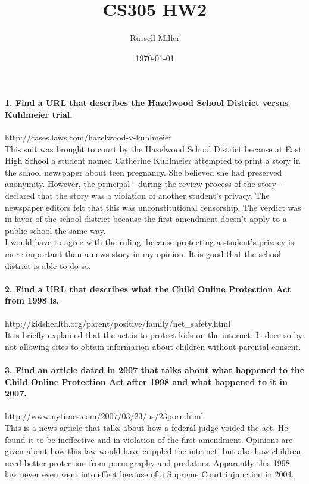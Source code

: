 \documentclass{article}
\title{CS305 HW2}
\author{Russell Miller}
\date{\today}
\begin{document}
\maketitle

\paragraph{1. Find a URL that describes the Hazelwood School District versus Kuhlmeier trial.\\}
http://cases.laws.com/hazelwood-v-kuhlmeier\\
This suit was brought to court by the Hazelwood School District because at East High School a student named Catherine Kuhlmeier attempted to print a story in the school newspaper about teen pregnancy.  She believed she had preserved anonymity. 
However, the principal - during the review process of the story - declared that the story was a violation of another student's privacy.
The newspaper editors felt that this was unconstitutional censorship.
The verdict was in favor of the school district because the first amendment doesn't apply to a public school the same way.\\
I would have to agree with the ruling, because protecting a student's privacy is more important than a news story in my opinion. It is good that the school district is able to do so.

\paragraph{2. Find a URL that describes what the Child Online Protection Act from 1998 is.\\}
http://kidshealth.org/parent/positive/family/net\_safety.html\\
It is briefly explained that the act is to protect kids on the internet. It does so by not allowing sites to obtain information about children without parental consent.

\paragraph{3. Find an article dated in 2007 that talks about what happened to the Child Online Protection Act after 1998 and what happened to it in 2007.\\} 
http://www.nytimes.com/2007/03/23/us/23porn.html\\
This is a news article that talks about how a federal judge voided the act. He found it to be ineffective and in violation of the first amendment.
Opinions are given about how this law would have crippled the internet, but also how children need better protection from pornography and predators.
Apparently this 1998 law never even went into effect because of a Supreme Court injunction in 2004.
\end{document}
